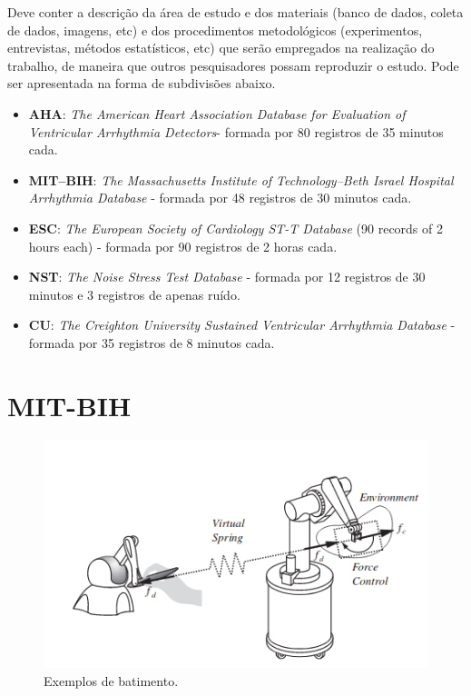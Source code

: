 Deve conter a descrição da área de estudo e dos materiais (banco de dados, coleta de dados, imagens, etc) e dos procedimentos metodológicos (experimentos, entrevistas, métodos estatísticos, etc) que serão empregados na realização do trabalho, de maneira que outros pesquisadores possam reproduzir o estudo. Pode ser apresentada na forma de subdivisões abaixo.

\begin{itemize}
	\item \large \textbf{AHA}: \large \textit{The American Heart Association Database for Evaluation of Ventricular Arrhythmia Detectors}- formada por 80 registros de 35 minutos cada.
	\item \large \textbf{MIT–BIH}: \large \textit{The Massachusetts Institute of Technology–Beth Israel Hospital Arrhythmia Database} - formada por 48 registros de 30 minutos cada.
	\item \large \textbf{ESC}: \large \textit{The European Society of Cardiology ST-T Database} (90 records of 2 hours each) - formada por 90 registros de 2 horas cada.
	\item \large \textbf{NST}: \large \textit{The Noise Stress Test Database} - formada por 12 registros de 30 minutos e 3 registros de apenas ruído.
	\item \large \textbf{CU}: \large \textit{The Creighton University Sustained Ventricular Arrhythmia Database} - formada por 35 registros de 8 minutos cada.
\end{itemize}

\section{MIT-BIH}

\begin{figure}[htb]
	\caption{Exemplos de batimento. }
	\begin{center}  
		\includegraphics[scale=0.6]{img/examples/haptic.png}
	\end{center}
	\label{fig_mitbih}
\end{figure}

